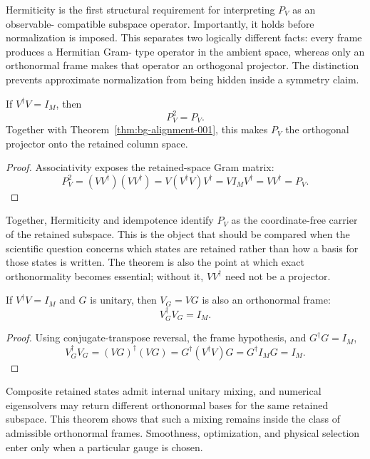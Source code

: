 Hermiticity is the first structural requirement for interpreting $P_V$ as an observable-
compatible subspace operator. Importantly, it holds before normalization is imposed.
This separates two logically different facts: every frame produces a Hermitian Gram-
type operator in the ambient space, whereas only an orthonormal frame makes that
operator an orthogonal projector. The distinction prevents approximate normalization
from being hidden inside a symmetry claim.

\begin{theorem}
\label{thm:bg-alignment-002}
If $V^\dagger V=I_M$, then
\[
  P_V^2=P_V.
\]
Together with Theorem~\ref{thm:bg-alignment-001}, this makes $P_V$ the orthogonal
projector onto the retained column space.
\end{theorem}

\begin{proof}
Associativity exposes the retained-space Gram matrix:
\[
  P_V^2=(VV^\dagger)(VV^\dagger)
  =V(V^\dagger V)V^\dagger
  =VI_MV^\dagger
  =VV^\dagger=P_V.
\]
\end{proof}

Together, Hermiticity and idempotence identify $P_V$ as the coordinate-free carrier of
the retained subspace. This is the object that should be compared when the scientific
question concerns which states are retained rather than how a basis for those states is
written. The theorem is also the point at which exact orthonormality becomes essential;
without it, $VV^\dagger$ need not be a projector.

\begin{theorem}
\label{thm:bg-alignment-003}
If $V^\dagger V=I_M$ and $G$ is unitary, then $V_G=VG$ is also an orthonormal frame:
\[
  V_G^\dagger V_G=I_M.
\]
\end{theorem}

\begin{proof}
Using conjugate-transpose reversal, the frame hypothesis, and $G^\dagger G=I_M$,
\[
  V_G^\dagger V_G
  =(VG)^\dagger(VG)
  =G^\dagger(V^\dagger V)G
  =G^\dagger I_MG
  =I_M.
\]
\end{proof}

Composite retained states admit internal unitary mixing, and numerical eigensolvers may
return different orthonormal bases for the same retained subspace. This theorem shows
that such a mixing remains inside the class of admissible orthonormal frames. Smoothness,
optimization, and physical selection enter only when a particular gauge is chosen.

